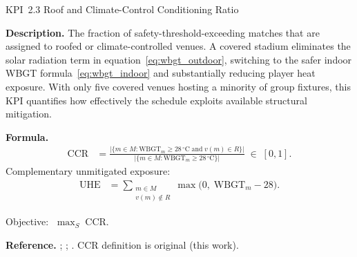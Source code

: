 \documentclass[12pt, letterpaper]{article}
\newcommand{\kpilabel}[1]{\noindent\textbf{#1}\enspace}
\begin{document}
\begin{kpibox}{KPI~2.3 \textendash{} Roof and Climate-Control Conditioning Ratio}

\kpilabel{Description.}
The fraction of safety-threshold-exceeding matches that are assigned to
roofed or climate-controlled venues.  A covered stadium eliminates the
solar radiation term in equation~\eqref{eq:wbgt_outdoor}, switching to
the safer indoor WBGT formula~\eqref{eq:wbgt_indoor} and substantially
reducing player heat exposure.  With only five covered venues hosting a
minority of group fixtures, this KPI quantifies how effectively the
schedule exploits available structural mitigation.

\medskip
\kpilabel{Formula.}
\begin{align*}
  \mathrm{CCR} &= \frac{\bigl|\{m \in M :
      \mathrm{WBGT}_m \geq 28\,^\circ\text{C}
      \;\text{and}\; v(m) \in R\}\bigr|}
    {\bigl|\{m \in M : \mathrm{WBGT}_m \geq
      28\,^\circ\text{C}\}\bigr|}
  \;\in\; [0,1].
\end{align*}
Complementary unmitigated exposure:
\begin{align*}
  \mathrm{UHE} &= \sum_{\substack{m \in M \\ v(m)\notin R}}
    \max\!\bigl(0,\;\mathrm{WBGT}_m - 28\bigr).
\end{align*}
\vspace{-8pt}

\noindent
Objective: $\;\displaystyle\max_{S}\;\mathrm{CCR}$.

\medskip
\kpilabel{Reference.}
\citet{FIFPRO2025}; \citet{Liljegren2008};
\citet{WorldWeatherAttribution2026}.
CCR definition is original (this work).
\end{kpibox}
\end{document}
